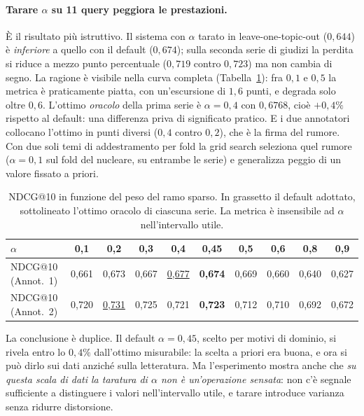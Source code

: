 \documentclass[11pt,a4paper]{report}
\begin{document}
\paragraph{Tarare $\alpha$ su 11 query peggiora le prestazioni.} È il risultato più istruttivo. Il
sistema con $\alpha$ tarato in leave-one-topic-out ($0{,}644$) è \emph{inferiore} a quello con il
default ($0{,}674$); sulla seconda serie di giudizi la perdita si riduce a mezzo punto percentuale
($0{,}719$ contro $0{,}723$) ma non cambia di segno. La ragione è visibile nella curva completa
(Tabella~\ref{tab:alpha-curve}): fra $0{,}1$ e $0{,}5$ la metrica è praticamente piatta, con
un'escursione di $1{,}6$ punti, e degrada solo oltre $0{,}6$. L'ottimo \emph{oracolo} della prima
serie è $\alpha = 0{,}4$ con $0{,}6768$, cioè $+0{,}4\%$ rispetto al default: una differenza priva
di significato pratico. E i due annotatori collocano l'ottimo in punti diversi ($0{,}4$ contro
$0{,}2$), che è la firma del rumore. Con due soli temi di addestramento per fold la grid search
seleziona quel rumore ($\alpha = 0{,}1$ sul fold del nucleare, su entrambe le serie) e generalizza
peggio di un valore fissato a priori.

\begin{table}[t]
\centering
\small
\begin{tabular}{lccccccccc}
\toprule
$\alpha$ & 0,1 & 0,2 & 0,3 & 0,4 & \textbf{0,45} & 0,5 & 0,6 & 0,8 & 0,9 \\
\midrule
NDCG@10 (Annot.\ 1) & 0,661 & 0,673 & 0,667 & \underline{0,677} & \textbf{0,674} & 0,669 & 0,660 & 0,640 & 0,627 \\
NDCG@10 (Annot.\ 2) & 0,720 & \underline{0,731} & 0,725 & 0,721 & \textbf{0,723} & 0,712 & 0,710 & 0,692 & 0,672 \\
\bottomrule
\end{tabular}
\caption{NDCG@10 in funzione del peso del ramo sparso. In grassetto il default adottato,
sottolineato l'ottimo oracolo di ciascuna serie. La metrica è insensibile ad $\alpha$
nell'intervallo utile.}
\label{tab:alpha-curve}
\end{table}

La conclusione è duplice. Il default $\alpha = 0{,}45$, scelto per motivi di dominio, si rivela
entro lo $0{,}4\%$ dall'ottimo misurabile: la scelta a priori era buona, e ora si può dirlo sui
dati anziché sulla letteratura. Ma l'esperimento mostra anche che \emph{su questa scala di dati la
taratura di $\alpha$ non è un'operazione sensata}: non c'è segnale sufficiente a distinguere i
valori nell'intervallo utile, e tarare introduce varianza senza ridurre distorsione.
\end{document}
